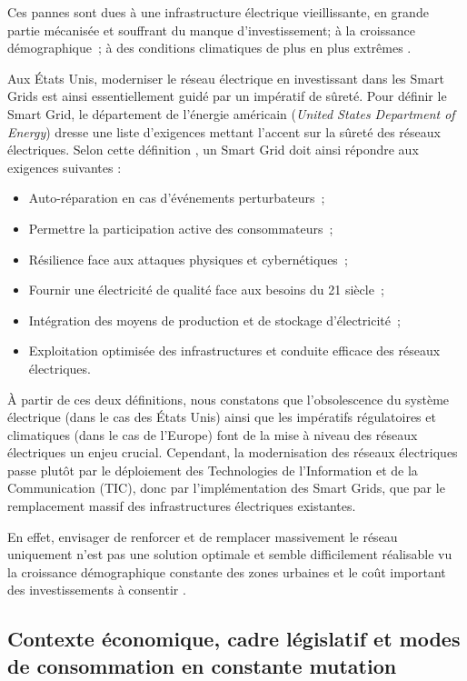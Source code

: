 Ces pannes sont dues à une infrastructure électrique vieillissante, en grande 
partie mécanisée et souffrant du manque d'investissement; à la croissance 
démographique~; à des conditions climatiques de plus en plus extrêmes 
\cite{outages}.

Aux États Unis, moderniser le réseau électrique en investissant dans les Smart 
Grids est ainsi essentiellement guidé par un impératif de sûreté. Pour définir 
le Smart Grid, le département de l'énergie américain (\textit{United States
Department of Energy}) dresse une liste d'exigences mettant l'accent sur la 
sûreté des réseaux électriques. Selon cette définition \cite{USDE}, un Smart 
Grid doit ainsi répondre aux exigences suivantes :
\begin{itemize}
\item Auto-réparation en cas d'événements perturbateurs~;
\item Permettre la participation active des consommateurs~; 
\item Résilience face aux attaques physiques et cybernétiques~;
\item Fournir une électricité de qualité face aux besoins du 21 siècle~;
\item Intégration des moyens de production et de stockage d'électricité~;
\item Exploitation optimisée des infrastructures et conduite efficace des 
réseaux électriques.
\end{itemize} 

À partir de ces deux définitions, nous constatons que l'obsolescence du système 
électrique (dans le cas des États Unis) ainsi que les impératifs régulatoires et 
climatiques (dans le cas de l'Europe) font de la mise à niveau des réseaux 
électriques un enjeu crucial. Cependant, la modernisation des réseaux 
électriques passe plutôt par le déploiement des Technologies de l'Information et 
de la Communication (TIC), donc par l'implémentation des Smart Grids, que par le 
remplacement massif des infrastructures électriques existantes.

En effet, envisager de renforcer et de remplacer massivement le réseau 
uniquement n'est pas une solution optimale et semble difficilement réalisable vu 
la croissance démographique constante des zones urbaines et le coût important 
des investissements à consentir \cite{cre}.

\subsection{Contexte économique, cadre législatif et modes de con\-sommation en 
constante mutation}

